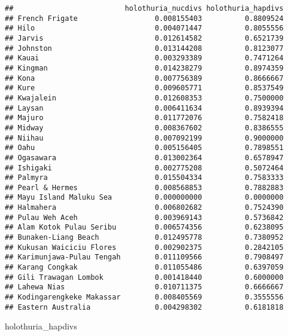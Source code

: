 \documentclass[
]{article}
\newenvironment{Shaded}{\begin{snugshade}}{\end{snugshade}}
\newcommand{\NormalTok}[1]{#1}
\begin{document}
\begin{verbatim}
##                          holothuria_nucdivs holothuria_hapdivs
## French Frigate                  0.008155403          0.8809524
## Hilo                            0.004071447          0.8055556
## Jarvis                          0.012614582          0.6521739
## Johnston                        0.013144208          0.8123077
## Kauai                           0.003293389          0.7471264
## Kingman                         0.014238279          0.8974359
## Kona                            0.007756389          0.8666667
## Kure                            0.009605771          0.8537549
## Kwajalein                       0.012608353          0.7500000
## Laysan                          0.006411634          0.8939394
## Majuro                          0.011772076          0.7582418
## Midway                          0.008367602          0.8386555
## Niihau                          0.007092199          0.9000000
## Oahu                            0.005156405          0.7898551
## Ogasawara                       0.013002364          0.6578947
## Ishigaki                        0.002775208          0.5072464
## Palmyra                         0.015504334          0.7583333
## Pearl & Hermes                  0.008568853          0.7882883
## Mayu Island Maluku Sea          0.000000000          0.0000000
## Halmahera                       0.006802682          0.7524390
## Pulau Weh Aceh                  0.003969143          0.5736842
## Alam Kotok Pulau Seribu         0.006574356          0.6238095
## Bunaken-Liang Beach             0.012495778          0.7380952
## Kukusan Waiciciu Flores         0.002902375          0.2842105
## Karimunjawa-Pulau Tengah        0.011109566          0.7908497
## Karang Congkak                  0.011055486          0.6397059
## Gili Trawagan Lombok            0.001418440          0.6000000
## Lahewa Nias                     0.010711375          0.6666667
## Kodingarengkeke Makassar        0.008405569          0.3555556
## Eastern Australia               0.004298302          0.6181818
\end{verbatim}

\begin{Shaded}
\begin{Highlighting}[]
\NormalTok{holothuria_hapdivs}
\end{Highlighting}
\end{Shaded}
\end{document}
